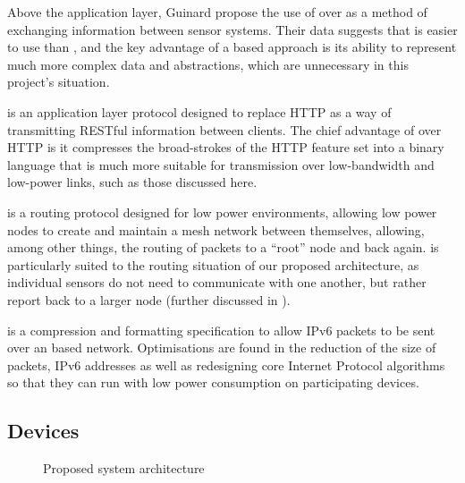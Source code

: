 \documentclass[../thesis/thesis.tex]{subfiles}
\begin{document}
Above the application layer, Guinard \etal \cite{guinard2012search} propose the use of \rest over \ws as a method of exchanging information between sensor systems. Their data suggests that \rest is easier to use than \ws, and the key advantage of a \ws based approach is its ability to represent much more complex data and abstractions, which are unnecessary in this project's situation.

\coap \cite{kovatsch2013coap} is an application layer protocol designed to replace HTTP as a way of transmitting RESTful information between clients. The chief advantage of \coap over HTTP is it compresses the broad-strokes of the HTTP feature set into a binary language that is much more suitable for transmission over low-bandwidth and low-power links, such as those discussed here.

\roll \cite{rfc6550} is a routing protocol designed for low power environments, allowing low power nodes to create and maintain a mesh network between themselves, allowing, among other things, the routing of packets to a ``root'' node and back again. \roll is particularly suited to the routing situation of our proposed architecture, as individual sensors do not need to communicate with one another, but rather report back to a larger node (further discussed in ).

\lowpan \cite{shelby20116lowpan} is a compression and formatting specification to allow IPv6 packets to be sent over an \lwifi based network. Optimisations are found in the reduction of the size of \lowpan packets, IPv6 addresses as well as redesigning core Internet Protocol algorithms so that they can run with low power consumption on participating devices.


\subsection{Devices}
\label{subsec:litreview:architecture:devices}
\begin{figure}
\centering
{}
\caption{Proposed system architecture}
\label{fig:litreview:devices}
\end{figure}
\end{document}
